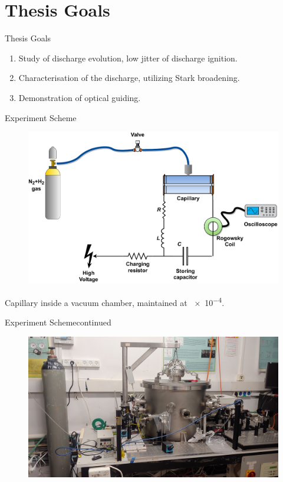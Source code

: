 \documentclass[dvipsnames]{beamer}
\begin{document}
\section{Thesis Goals}
\begin{frame}{Thesis Goals}
 \begin{enumerate}
\item Study of discharge evolution, low jitter of discharge ignition.
\item Characterisation of the discharge, utilizing Stark broadening.
\item Demonstration of optical guiding.
 \end{enumerate}
\end{frame}
\begin{frame}{Experiment Scheme}
\begin{figure}
 \includegraphics[width=\textwidth]{figures/results/jitter/discharge_scheme.pdf}
\end{figure}
Capillary inside a vacuum chamber, maintained at \SI{e-4}{\torr}.
\end{frame}
\begin{frame}{Experiment Scheme}{continued}
\begin{figure}
 \includegraphics[width=\textwidth]{figures/results/jitter/system_picture.jpg}
\end{figure}
\end{frame}
\end{document}
